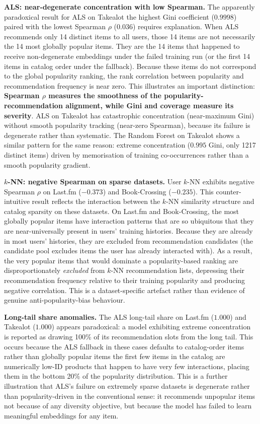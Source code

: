 \documentclass[11pt,a4paper]{report}
\begin{document}
\textbf{ALS: near-degenerate concentration with low Spearman.} The apparently paradoxical result for ALS on Takealot the highest Gini coefficient ($0.9998$) paired with the lowest Spearman $\rho$ ($0.036$) requires explanation. When ALS recommends only 14 distinct items to all users, those 14 items are not necessarily the 14 most globally popular items. They are the 14 items that happened to receive non-degenerate embeddings under the failed training run (or the first 14 items in catalog order under the fallback). Because these items do not correspond to the global popularity ranking, the rank correlation between popularity and recommendation frequency is near zero. This illustrates an important distinction: \textbf{Spearman $\rho$ measures the smoothness of the popularity-recommendation alignment, while Gini and coverage measure its severity}. ALS on Takealot has catastrophic concentration (near-maximum Gini) without smooth popularity tracking (near-zero Spearman), because its failure is degenerate rather than systematic. The Random Forest on Takealot shows a similar pattern for the same reason: extreme concentration ($0.995$ Gini, only 1217 distinct items) driven by memorisation of training co-occurrences rather than a smooth popularity gradient.

\textbf{$k$-NN: negative Spearman on sparse datasets.} User $k$-NN exhibits negative Spearman $\rho$ on Last.fm ($-0.373$) and Book-Crossing ($-0.235$). This counter-intuitive result reflects the interaction between the $k$-NN similarity structure and catalog sparsity on these datasets. On Last.fm and Book-Crossing, the most globally popular items have interaction patterns that are so ubiquitous that they are near-universally present in users' training histories. Because they are already in most users' histories, they are excluded from recommendation candidates (the candidate pool excludes items the user has already interacted with). As a result, the very popular items that would dominate a popularity-based ranking are disproportionately \emph{excluded} from $k$-NN recommendation lists, depressing their recommendation frequency relative to their training popularity and producing negative correlation. This is a dataset-specific artefact rather than evidence of genuine anti-popularity-bias behaviour.

\textbf{Long-tail share anomalies.} The ALS long-tail share on Last.fm ($1.000$) and Takealot ($1.000$) appears paradoxical: a model exhibiting extreme concentration is reported as drawing 100\% of its recommendation slots from the long tail. This occurs because the ALS fallback in these cases defaults to catalog-order items rather than globally popular items the first few items in the catalog are numerically low-ID products that happen to have very few interactions, placing them in the bottom 20\% of the popularity distribution. This is a further illustration that ALS's failure on extremely sparse datasets is degenerate rather than popularity-driven in the conventional sense: it recommends unpopular items not because of any diversity objective, but because the model has failed to learn meaningful embeddings for any item.
\end{document}

